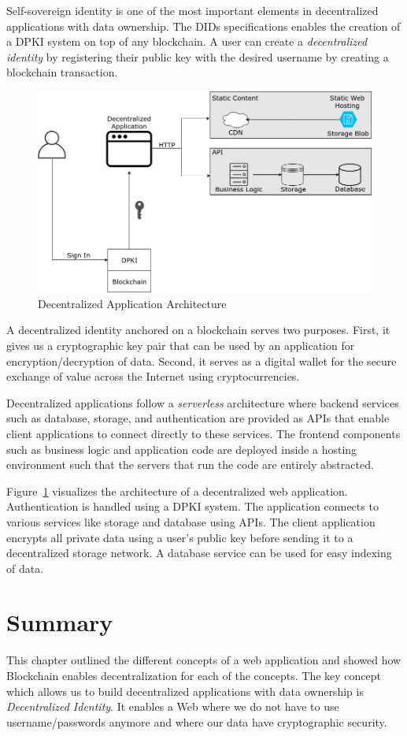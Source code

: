 	Self-sovereign identity is one of the most important elements in decentralized applications with data ownership.  The DIDs\cite{did:spec:0:13} specifications enables the creation of a DPKI system on top of any blockchain. A user can create a \textit{decentralized identity} by registering their public key with the desired username by creating a blockchain transaction.
	
	\begin{figure}[h]
		\includegraphics[width=\linewidth]{figures/dapp-architecture}
		\caption{\label{fig:dapp-architecture} Decentralized Application Architecture}
	\end{figure}

	A decentralized identity anchored on a blockchain serves two purposes. First, it gives us a cryptographic key pair that can be used by an application for encryption/decryption of data. Second, it serves as a digital wallet for the secure exchange of value across the Internet using cryptocurrencies.
	
	Decentralized applications follow a \textit{serverless} architecture where backend services such as database, storage, and authentication are provided as APIs that enable client applications to connect directly to these services. The frontend components such as business logic and application code are deployed inside a hosting environment such that the servers that run the code are entirely abstracted.
	
	Figure~\ref{fig:dapp-architecture} visualizes the architecture of a decentralized web application. Authentication is handled using a DPKI system. The application connects to various services like storage and database using APIs. The client application encrypts all private data using a user's public key before sending it to a decentralized storage network. A database service can be used for easy indexing of data.
	
\section{Summary}
	This chapter outlined the different concepts of a web application and showed how Blockchain enables decentralization for each of the concepts. The key concept which allows us to build decentralized applications with data ownership is \textit{Decentralized Identity}. It enables a Web where we do not have to use username/passwords anymore and where our data have cryptographic security.